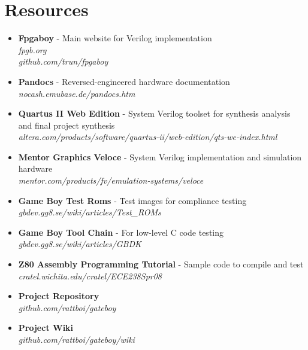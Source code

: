\section{Resources}
\begin{itemize}
    \item {\bf Fpgaboy}
            - Main website for Verilog implementation\\
            {\it fpgb.org} \\
            {\it github.com/trun/fpgaboy}
    \item {\bf Pandocs} - Reversed-engineered hardware documentation\\ 
            {\it nocash.emubase.de/pandocs.htm}
    \item {\bf Quartus II Web Edition} - System Verilog toolset 
             for synthesis analysis and final project synthesis\\
            {\it altera.com/products/software/quartus-ii/web-edition/qts-we-index.html}
    \item {\bf Mentor Graphics Veloce} - System Verilog implementation and simulation hardware\\
            {\it mentor.com/products/fv/emulation-systems/veloce}
    \item {\bf Game Boy Test Roms}     - Test images for compliance testing\\
            {\it gbdev.gg8.se/wiki/articles/Test\_ROMs}
    \item {\bf Game Boy Tool Chain} - For low-level C code testing\\
            {\it gbdev.gg8.se/wiki/articles/GBDK}
    \item {\bf Z80 Assembly Programming Tutorial} - Sample code to compile and test\\
            {\it cratel.wichita.edu/cratel/ECE238Spr08}
    \item {\bf Project Repository}\\
            {\it github.com/rattboi/gateboy}
    \item {\bf Project Wiki}\\
            {\it github.com/rattboi/gateboy/wiki}
\end{itemize}

